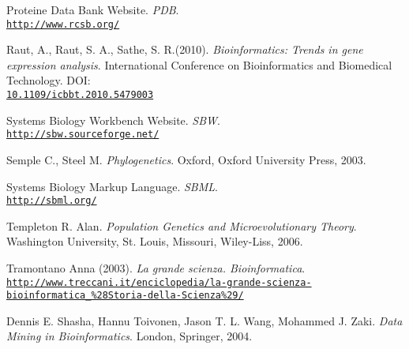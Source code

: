 \documentclass[twoside,openright,titlepage,fleqn,
,	headinclude,12pt,a4paper,BCOR5mm,footinclude,table]{scrbook}
\begin{document}
\begin{thebibliography}{50}
Proteine Data Bank Website.\newline
\textit{PDB}.
\\\texttt{\url{http://www.rcsb.org/}}

Raut, A., Raut, S. A., Sathe, S. R.(2010). \newline
\textit{Bioinformatics: Trends in gene expression analysis}.\newline
International Conference on Bioinformatics and Biomedical Technology.\newline
DOI:\\\texttt{\url{10.1109/icbbt.2010.5479003}}

Systems Biology Workbench Website.\newline
\textit{SBW}.
\\\texttt{\url{http://sbw.sourceforge.net/}}

Semple C., Steel M.\newline
\textit{Phylogenetics}.\newline
Oxford, Oxford University Press, 2003.

Systems Biology Markup Language.\newline
\textit{SBML}.
\\\texttt{\url{http://sbml.org/}}

Templeton R. Alan.\newline
\textit{Population Genetics and Microevolutionary Theory}.\newline
Washington University, St. Louis, Missouri, Wiley-Liss, 2006.

Tramontano Anna (2003).\newline
\textit{La grande scienza. Bioinformatica}.
\\\texttt{\url{http://www.treccani.it/enciclopedia/la-grande-scienza-bioinformatica_\%28Storia-della-Scienza\%29/}}

Dennis E. Shasha, Hannu Toivonen, Jason T. L. Wang, Mohammed J. Zaki. \newline
\textit{Data Mining in Bioinformatics}.\newline
London, Springer, 2004.

\end{thebibliography}


\end{document}
